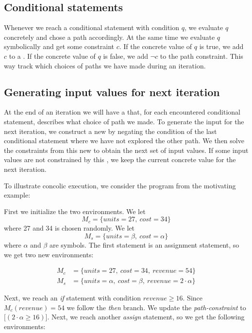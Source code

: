 	\subsection{Conditional statements}
	
	Whenever we reach a conditional statement with condition $q$, we evaluate $q$ concretely and chose a path accordingly. At the same time we evaluate $q$ symbolically and get some constraint $c$. If the concrete value of $q$ is true, we add $c$ to a \pc. If the concrete value of $q$ is false, we add $\neg c$ to the path constraint. This way track which choices of paths we have made during an iteration. 
	
	\subsection{Generating input values for next iteration}
	
	At the end of an iteration we will have a \pc that, for each encountered conditional statement, describes what choice of path we made. To generate the input for the next iteration, we construct a new \pc by negating the condition of the last conditional statement where we have not explored the other path. We then solve the constraints from this new \pc to obtain the next set of input values. If some input values are not constrained by this \pc, we keep the current concrete value for the next iteration. 

\bigskip
To illustrate concolic execution, we consider the program from the motivating example:
\motexample

\noindent First we initialize the two environments. We let 
\begin{equation*}
	M_c = \{units = 27, \ cost = 34\}
\end{equation*}
 where 27 and 34 is chosen randomly. We let
\begin{equation*}
 	M_s = \{units =\beta, \ cost = \alpha\}
\end{equation*}
where $\alpha$ and $\beta$ are symbols. The first statement is an assignment statement, so we get two new environments:

\begin{align*}
	M_c & = \{units = 27, \ cost = 34, \ revenue = 54 \}\\
	M_s & = \{units = \alpha, \ cost = \beta, \ revenue = 2\cdot \alpha \}
\end{align*}

Next, we reach an \textsl{if} statement with condition $revenue \geq 16$. Since $M_c(revenue) = 54$ we follow the \textsl{then} branch. We update the \emph{path-constraint} to $\lbrack (2\cdot \alpha \geq 16) \rbrack$. Next, we reach another \textsl{assign} statement, so we get the following environments:

